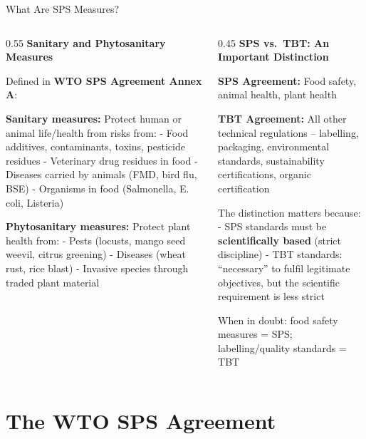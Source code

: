 \documentclass[
  ignorenonframetext,
  aspectratio=169,
]{beamer}
\makeatletter
\let\quarto@originallabel\label
\DeclareRobustCommand*{\label}[1]{\quarto@originallabel{#1}}
\makeatother
\begin{document}
\begin{frame}{What Are SPS Measures?}
\label{what-are-sps-measures}
\begin{columns}[T]
\begin{column}{0.55\linewidth}
\textbf{Sanitary and Phytosanitary Measures}

Defined in \textbf{WTO SPS Agreement Annex A}:

\textbf{Sanitary measures:} Protect human or animal life/health from
risks from: - Food additives, contaminants, toxins, pesticide residues -
Veterinary drug residues in food - Diseases carried by animals (FMD,
bird flu, BSE) - Organisms in food (Salmonella, E. coli, Listeria)

\textbf{Phytosanitary measures:} Protect plant health from: - Pests
(locusts, mango seed weevil, citrus greening) - Diseases (wheat rust,
rice blast) - Invasive species through traded plant material
\end{column}

\begin{column}{0.45\linewidth}
\textbf{SPS vs.~TBT: An Important Distinction}

\textbf{SPS Agreement:} Food safety, animal health, plant health

\textbf{TBT Agreement:} All other technical regulations -- labelling,
packaging, environmental standards, sustainability certifications,
organic certification

The distinction matters because: - SPS standards must be
\textbf{scientifically based} (strict discipline) - TBT standards:
``necessary'' to fulfil legitimate objectives, but the scientific
requirement is less strict

When in doubt: food safety measures = SPS; labelling/quality standards =
TBT
\end{column}
\end{columns}
\end{frame}

\begin{frame}
\end{frame}

\section{The WTO SPS Agreement}\label{the-wto-sps-agreement}
\end{document}
